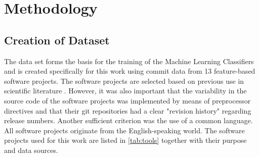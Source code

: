 
\section{Methodology}

\subsection{Creation of Dataset}

The data set forms the basis for the training of the Machine Learning Classifiers and is created specifically for this work using commit data from 13 feature-based software projects. The software projects are selected based on previous use in scientific literature \cite{Hunsen2015,Liebig2010,Queiroz2015,Queiroz2016}. However, it was also important that the variability in the source code of the software projects was implemented by means of preprocessor directives and that their git repositories had a clear "revision history" regarding release numbers. Another sufficient criterion was the use of a common language. All software projects originate from the English-speaking world. The software projects used for this work are listed in \autoref{tab:tools} together with their purpose and data sources.

